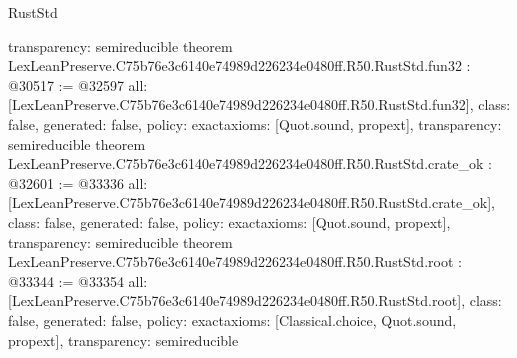\begin{lexlean}{RustStd}
\begin{coremodule}
{  transparency: semireducible
}
theorem LexLeanPreserve.C75b76e3c6140e74989d226234e0480ff.R50.RustStd.fun32 : @30517 := @32597 {
  all: [LexLeanPreserve.C75b76e3c6140e74989d226234e0480ff.R50.RustStd.fun32],
  class: false,
  generated: false,
  policy: exact{axioms: [Quot.sound, propext]},
  transparency: semireducible
}
theorem LexLeanPreserve.C75b76e3c6140e74989d226234e0480ff.R50.RustStd.crate_ok : @32601 := @33336 {
  all: [LexLeanPreserve.C75b76e3c6140e74989d226234e0480ff.R50.RustStd.crate_ok],
  class: false,
  generated: false,
  policy: exact{axioms: [Quot.sound, propext]},
  transparency: semireducible
}
theorem LexLeanPreserve.C75b76e3c6140e74989d226234e0480ff.R50.RustStd.root : @33344 := @33354 {
  all: [LexLeanPreserve.C75b76e3c6140e74989d226234e0480ff.R50.RustStd.root],
  class: false,
  generated: false,
  policy: exact{axioms: [Classical.choice, Quot.sound, propext]},
  transparency: semireducible
}


\end{coremodule}
\end{lexlean}
